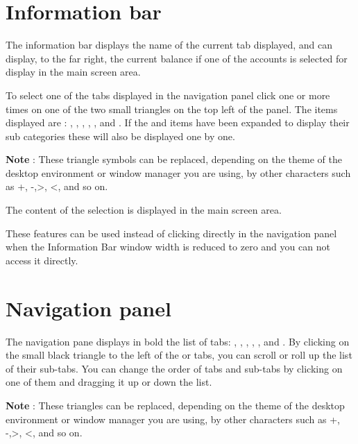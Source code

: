 \section{Information bar\label{home-synthesis}}

The information bar displays the name of the current tab displayed, and can display, to the far right, the current balance if one of the accounts is selected for display in the main screen area.


To select one of the tabs displayed in the navigation panel click one or more times on one of the two small triangles on the top left of the panel.  The items displayed are : , , , , ,  and .  If the  and  items have been expanded to display their sub categories these will also be displayed one by one.

\textbf{Note} : These triangle symbols can be replaced, depending on the theme of the desktop environment or window manager you are using, by other characters such as +, -,>, <, and so on.

The content of the selection is displayed in the main screen area.

These features can be used instead of clicking directly in the navigation panel when the Information Bar window width is reduced to zero and you can not access it directly.


\section{Navigation panel\label{home-accounting}}

The navigation pane displays in bold the list of tabs:  , , , , ,  and . By clicking on the small black triangle to the left of the   or  tabs,  you can scroll or roll up the list of their sub-tabs. You can change the order of tabs and sub-tabs by clicking on one of them and dragging it up or down the list.

\textbf{Note} : These triangles can be replaced, depending on the theme of the desktop environment or window manager you are using, by other characters such as +, -,>, <, and so on.

